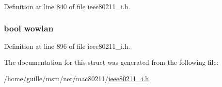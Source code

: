 Definition at line 840 of file ieee80211\-\_\-i.\-h.

\hypertarget{structieee80211__local_aafe36b77f629fe748f545f726849bb4c}{
\subsubsection[{wowlan}]{\setlength{\rightskip}{0pt plus 5cm}bool wowlan}}\label{structieee80211__local_aafe36b77f629fe748f545f726849bb4c}


Definition at line 896 of file ieee80211\-\_\-i.\-h.



The documentation for this struct was generated from the following file\-:\begin{DoxyCompactItemize}
\item 
/home/guille/msm/net/mac80211/\hyperlink{ieee80211__i_8h}{ieee80211\-\_\-i.\-h}\end{DoxyCompactItemize}
